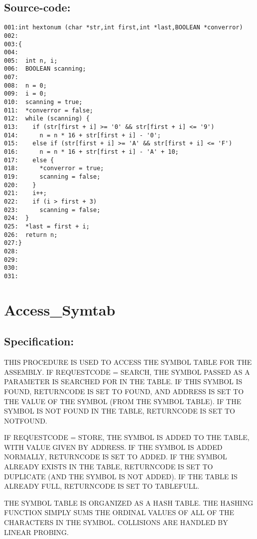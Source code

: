 \subsection*{Source-code:}
\begin{verbatim}
001:int hextonum (char *str,int first,int *last,BOOLEAN *converror)
002:
003:{
004:
005:  int n, i;
006:  BOOLEAN scanning;
007:
008:  n = 0;
009:  i = 0;
010:  scanning = true;
011:  *converror = false;
012:  while (scanning) {
013:    if (str[first + i] >= '0' && str[first + i] <= '9')
014:      n = n * 16 + str[first + i] - '0';
015:    else if (str[first + i] >= 'A' && str[first + i] <= 'F')
016:      n = n * 16 + str[first + i] - 'A' + 10;
017:    else {
018:      *converror = true;
019:      scanning = false;
020:    }
021:    i++;
022:    if (i > first + 3)
023:      scanning = false;
024:  }
025:  *last = first + i;
026:  return n;
027:}
028:
029:
030:
031:
\end{verbatim}
\section{Access\_Symtab}
\subsection*{Specification:}
THIS PROCEDURE IS USED TO ACCESS THE SYMBOL TABLE FOR THE ASSEMBLY.  IF
REQUESTCODE = SEARCH, THE SYMBOL PASSED AS A PARAMETER IS SEARCHED FOR IN THE
TABLE. IF THIS SYMBOL IS FOUND, RETURNCODE IS SET TO FOUND, AND ADDRESS IS
SET TO THE VALUE OF THE SYMBOL (FROM THE SYMBOL TABLE). IF THE SYMBOL IS NOT
FOUND IN THE TABLE, RETURNCODE IS SET TO NOTFOUND.

IF REQUESTCODE = STORE, THE SYMBOL IS ADDED TO THE TABLE, WITH VALUE GIVEN BY
ADDRESS. IF THE SYMBOL IS ADDED NORMALLY, RETURNCODE IS SET TO ADDED. IF THE
SYMBOL ALREADY EXISTS IN THE TABLE, RETURNCODE IS SET TO DUPLICATE (AND THE
SYMBOL IS NOT ADDED). IF THE TABLE IS ALREADY FULL, RETURNCODE IS SET TO
TABLEFULL.

THE SYMBOL TABLE IS ORGANIZED AS A HASH TABLE. THE HASHING FUNCTION SIMPLY
SUMS THE ORDINAL VALUES OF ALL OF THE CHARACTERS IN THE SYMBOL. COLLISIONS
ARE HANDLED BY LINEAR PROBING.
